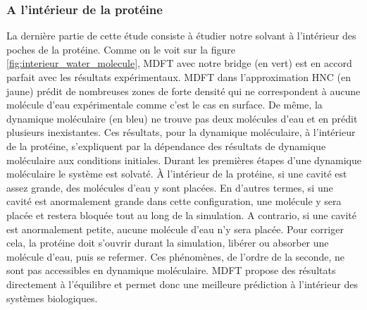 \subsubsection{A l'intérieur de la protéine}
La dernière partie de cette étude consiste à étudier notre solvant à l'intérieur des poches de la protéine. Comme on le voit sur la figure \ref{fig:interieur_water_molecule}, MDFT avec notre bridge (en vert) est en accord parfait avec les résultats expérimentaux. MDFT dans l'approximation HNC (en jaune) prédit de nombreuses zones de forte densité qui ne correspondent à aucune molécule d'eau expérimentale comme c'est le cas en surface. De même, la dynamique moléculaire (en bleu) ne trouve pas deux molécules d'eau et en prédit plusieurs inexistantes. Ces résultats, pour la dynamique moléculaire, à l'intérieur de la protéine, s'expliquent par la dépendance des résultats de dynamique moléculaire aux conditions initiales. Durant les premières étapes d'une dynamique moléculaire le système est solvaté. À l'intérieur de la protéine, si une cavité est assez grande, des molécules d'eau y sont placées. En d'autres termes, si une cavité est anormalement grande dans cette configuration, une molécule y sera placée et restera bloquée tout au long de la simulation. A contrario, si une cavité est anormalement petite, aucune molécule d'eau n'y sera placée. Pour corriger cela, la protéine doit s'ouvrir durant la simulation, libérer ou absorber une molécule d'eau, puis se refermer. Ces phénomènes, de l'ordre de la seconde, ne sont pas accessibles en dynamique moléculaire. MDFT propose des résultats directement à l'équilibre et permet donc une meilleure prédiction à l'intérieur des systèmes biologiques.




